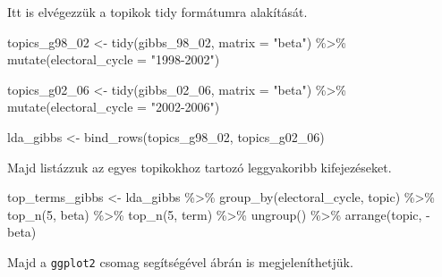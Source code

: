 \documentclass[
]{book}
\newenvironment{Shaded}{\begin{snugshade}}{\end{snugshade}}
\newcommand{\AttributeTok}[1]{\textcolor[rgb]{0.77,0.63,0.00}{#1}}
\newcommand{\DecValTok}[1]{\textcolor[rgb]{0.00,0.00,0.81}{#1}}
\newcommand{\FunctionTok}[1]{\textcolor[rgb]{0.00,0.00,0.00}{#1}}
\newcommand{\NormalTok}[1]{#1}
\newcommand{\OtherTok}[1]{\textcolor[rgb]{0.56,0.35,0.01}{#1}}
\newcommand{\SpecialCharTok}[1]{\textcolor[rgb]{0.00,0.00,0.00}{#1}}
\newcommand{\StringTok}[1]{\textcolor[rgb]{0.31,0.60,0.02}{#1}}
\begin{document}
Itt is elvégezzük a topikok tidy formátumra alakítását.

\begin{Shaded}
\begin{Highlighting}[]
\NormalTok{topics\_g98\_02 }\OtherTok{\textless{}{-}} \FunctionTok{tidy}\NormalTok{(gibbs\_98\_02, }\AttributeTok{matrix =} \StringTok{"beta"}\NormalTok{) }\SpecialCharTok{\%\textgreater{}\%}
  \FunctionTok{mutate}\NormalTok{(}\AttributeTok{electoral\_cycle =} \StringTok{"1998{-}2002"}\NormalTok{)}

\NormalTok{topics\_g02\_06 }\OtherTok{\textless{}{-}} \FunctionTok{tidy}\NormalTok{(gibbs\_02\_06, }\AttributeTok{matrix =} \StringTok{"beta"}\NormalTok{) }\SpecialCharTok{\%\textgreater{}\%}
  \FunctionTok{mutate}\NormalTok{(}\AttributeTok{electoral\_cycle =} \StringTok{"2002{-}2006"}\NormalTok{)}

\NormalTok{lda\_gibbs }\OtherTok{\textless{}{-}} \FunctionTok{bind\_rows}\NormalTok{(topics\_g98\_02, topics\_g02\_06)}
\end{Highlighting}
\end{Shaded}

Majd listázzuk az egyes topikokhoz tartozó leggyakoribb kifejezéseket.

\begin{Shaded}
\begin{Highlighting}[]
\NormalTok{top\_terms\_gibbs }\OtherTok{\textless{}{-}}\NormalTok{ lda\_gibbs }\SpecialCharTok{\%\textgreater{}\%}
  \FunctionTok{group\_by}\NormalTok{(electoral\_cycle, topic) }\SpecialCharTok{\%\textgreater{}\%}
  \FunctionTok{top\_n}\NormalTok{(}\DecValTok{5}\NormalTok{, beta) }\SpecialCharTok{\%\textgreater{}\%}
  \FunctionTok{top\_n}\NormalTok{(}\DecValTok{5}\NormalTok{, term) }\SpecialCharTok{\%\textgreater{}\%}
  \FunctionTok{ungroup}\NormalTok{() }\SpecialCharTok{\%\textgreater{}\%}
  \FunctionTok{arrange}\NormalTok{(topic, }\SpecialCharTok{{-}}\NormalTok{beta)}
\end{Highlighting}
\end{Shaded}

Majd a \texttt{ggplot2} csomag segítségével ábrán is megjeleníthetjük.
\end{document}
